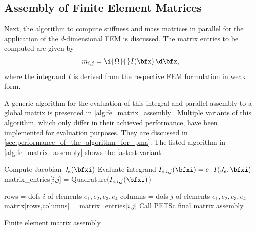 \subsection{Assembly of Finite Element Matrices}\label{sec:assembly_of_finite_element_matrices}

Next, the algorithm to compute stiffness and mass matrices in parallel for the application of the $d$-dimensional FEM is discussed.
The matrix entries to be computed are given by%
\begin{align}\label{eq:alg_assembly_m}
  m_{i,j} = \i{\Omega}{} I(\bfx) \,\d\bfx,
\end{align}
where the integrand $I$ is derived from the respective FEM formulation in weak form.

A generic algorithm for the evaluation of this integral and parallel assembly to a global matrix is presented in \cref{alg:fe_matrix_assembly}. Multiple variants of this algorithm, which only differ in their achieved performance, have been implemented for evaluation purposes. They are discussed in \cref{sec:performance_of_the_algorithm_for_pma}. The listed algorithm in \cref{alg:fe_matrix_assembly} shows the fastest variant.

\begin{algorithm}
  \begin{algorithmic}[1]%
          \label{line:4.2}
                                    \label{line:4.3}
        \State Compute Jacobian $J_e(\bfxi)$                    \label{line:4.4}
        \State Evaluate integrand $I_{e,i,j}(\bfxi) = c\cdot I(J_e,\bfxi)$                     \label{line:4.5}
      \EndFor
      \State matrix\_entries[$i$,$j$] = Quadrature($I_{e,i,j}(\bfxi)$)                       \label{line:4.6}
      
                            \label{line:4.7}
                            \label{line:4.8}
          \State rows \hspace*{4.1mm} = dofs $i$ of elements $e_1,e_2,e_3,e_4$                    \label{line:4.9}
          \State columns = dofs $j$ of elements $e_1,e_2,e_3,e_4$  \label{line:4.10}
          \State matrix[rows,columns] = matrix\_entries[$i$,$j$]   \label{line:4.11}
        \EndFor
      \EndFor
    \EndFor
    \State Call PETSc final matrix assembly                    \label{line:4.12}
    \EndProcedure
  \end{algorithmic}%
  \caption{Finite element matrix assembly}%
  \label{alg:fe_matrix_assembly}%
\end{algorithm}%

